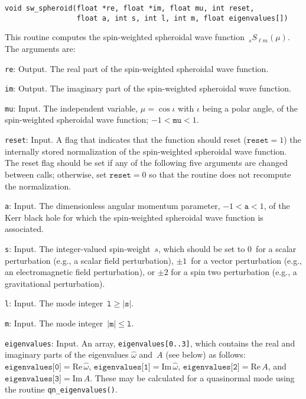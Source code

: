 \begin{verbatim}
void sw_spheroid(float *re, float *im, float mu, int reset,
                 float a, int s, int l, int m, float eigenvalues[])
\end{verbatim}
This routine computes the spin-weighted spheroidal wave
function~${}_sS_{\ell m}(\mu)$.  The arguments are:
\begin{description}
\item{\texttt{re}}: Output.  The real part of the spin-weighted spheroidal
  wave function.
\item{\texttt{im}}: Output.  The imaginary part of the spin-weighted spheroidal
  wave function.
\item{\texttt{mu}}: Input.  The independent variable, $\mu=\cos\iota$ with
  $\iota$ being a polar angle, of the spin-weighted spheroidal wave function;
  $-1<\texttt{mu}<1$.
\item{\texttt{reset}}: Input.  A flag that indicates that the function should
  reset ($\texttt{reset}=1$) the internally stored normalization of the
  spin-weighted spheroidal wave function.  The reset flag should be set
  if any of the following five arguments are changed between calls; otherwise,
  set $\texttt{reset}=0$ so that the routine does not recompute the
  normalization.
\item{\texttt{a}}: Input.  The dimensionless angular momentum parameter,
  $-1<\texttt{a}<1$, of the Kerr black hole for which the spin-weighted
  spheroidal wave function is associated.
\item{\texttt{s}}: Input.  The integer-valued spin-weight~$s$, which should
  be set to $0$~for a scalar perturbation (e.g., a scalar field perturbation),
  $\pm1$~for a vector perturbation (e.g., an electromagnetic field
  perturbation), or $\pm2$ for a spin two perturbation (e.g., a gravitational
  perturbation).
\item{\texttt{l}}: Input.  The mode integer~$\texttt{l}\ge|\texttt{s}|$.
\item{\texttt{m}}: Input.  The mode integer~$|\texttt{m}|\le\texttt{l}$.
\item{\texttt{eigenvalues}}: Input.  An array, \texttt{eigenvalues[0..3]},
  which contains the real and imaginary parts of the eigenvalues
  $\hat{\omega}$ and~$A$ (see below) as follows:
  $\texttt{eigenvalues[0]}={\mathrm{Re}}\,\hat{\omega}$,
  $\texttt{eigenvalues[1]}={\mathrm{Im}}\,\hat{\omega}$,
  $\texttt{eigenvalues[2]}={\mathrm{Re}}\,A$,
  and~$\texttt{eigenvalues[3]}={\mathrm{Im}}\,A$.  These may be calculated for
  a quasinormal mode using the routine \texttt{qn\_eigenvalues()}.
\end{description}


